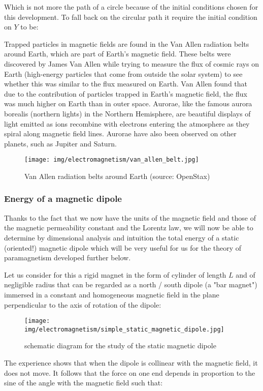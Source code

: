 	Which is not more the path of a circle because of the initial conditions chosen for this development. To fall back on the circular path it require the initial condition on $Y$ to be:
	
	Trapped particles in magnetic fields are found in the Van Allen radiation belts around Earth, which are part of Earth’s magnetic field. These belts were discovered by James Van Allen while trying to measure the flux of cosmic rays on Earth (high-energy particles that come from outside the solar system) to see whether this was similar to the flux measured on Earth. Van Allen found that due to the contribution of particles trapped in Earth’s magnetic field, the flux was much higher on Earth than in outer space. Aurorae, like the famous aurora borealis (northern lights) in the Northern Hemisphere, are beautiful displays of light emitted as ions recombine with electrons entering the atmosphere as they spiral along magnetic field lines. Aurorae have also been observed on other planets, such as Jupiter and Saturn.
	\begin{figure}[H]
		\centering
		\texttt{[image: img/electromagnetism/van\_allen\_belt.jpg]}
		\caption{Van Allen radiation belts around Earth (source: OpenStax)}
	\end{figure}
	
	\pagebreak
	\subsubsection{Energy of a magnetic dipole}
	Thanks to the fact that we now have the units of the magnetic field and those of the magnetic permeability constant and the Lorentz law, we will now be able to determine by dimensional analysis and intuition the total energy of a static (oriented!) magnetic dipole which will be very useful for us for the theory of paramagnetism developed further below.

	Let us consider for this a rigid magnet in the form of cylinder of length $L$ and of negligible radius that can be regarded as a north / south dipole (a "bar magnet") immersed in a constant and homogeneous magnetic field in the plane perpendicular to the axis of rotation of the dipole:
	\begin{figure}[H]
		\centering
		\texttt{[image: img/electromagnetism/simple\_static\_magnetic\_dipole.jpg]}
		\caption[]{schematic diagram for the study of the static magnetic dipole}
	\end{figure}
	The experience shows that when the dipole is collinear with the magnetic field, it does not move. It follows that the force on one end depends in proportion to the sine of the angle with the magnetic field such that:
	
